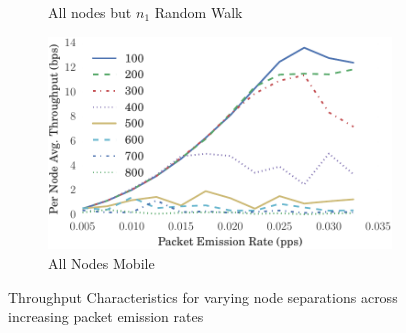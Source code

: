 \documentclass[runningheads,a4paper]{llncs}
\begin{document}
\begin{figure}
\begin{subfigure}{.5\textwidth}
  \caption{All nodes but $n_1$ Random Walk}
  \label{fig:throughput_allbut1}
\end{subfigure}
\begin{subfigure}{.5\textwidth}
\centering
  \includegraphics[width=.9\linewidth]{img/throughput_sep_lines_all_mobile.pdf}
  \caption{All Nodes Mobile}
  \label{fig:throughput_all_mobile}
\end{subfigure}
\caption{Throughput Characteristics for varying node separations across increasing packet emission rates}
\label{fig:scenario_througputs_plain}
\end{figure}
\end{document}
